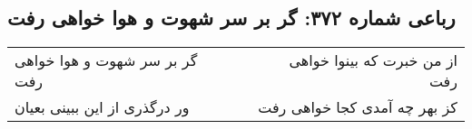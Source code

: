 \begin{center}
\section*{رباعی شماره ۳۷۲: گر بر سر شهوت و هوا خواهی رفت}
\label{sec:0372}
\begin{longtable}{l p{0.5cm} r}
گر بر سر شهوت و هوا خواهی رفت
&&
از من خبرت که بینوا خواهی رفت
\\
ور درگذری از این ببینی بعیان
&&
کز بهر چه آمدی کجا خواهی رفت
\\
\end{longtable}
\end{center}

